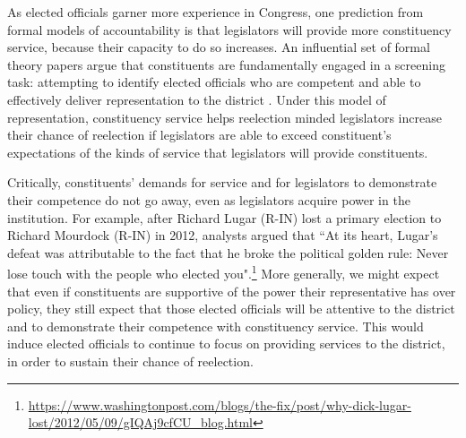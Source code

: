 \documentclass[12pt]{article}
\begin{document}
As elected officials garner more experience in Congress, one prediction from formal models of accountability is that legislators will provide more constituency service, because their capacity to do so increases.  An influential set of formal theory papers argue that constituents are fundamentally engaged in a screening task: attempting to identify elected officials who are competent and able to effectively deliver representation to the district \citep{AshworthBuenodeMesquita2006, gordon2009advantages}.  Under this model of representation, constituency service helps reelection minded legislators increase their chance of reelection if legislators are able to exceed constituent's expectations of the kinds of service that legislators will provide constituents.  

Critically, constituents' demands for service and for legislators to demonstrate their competence do not go away, even as legislators acquire power in the institution.  For example, after Richard Lugar (R-IN) lost a primary election to Richard Mourdock (R-IN) in 2012, analysts argued that ``At its heart, Lugar's defeat was attributable to the fact that he broke the political golden rule: Never lose touch with the people who elected you".\footnote{\url{https://www.washingtonpost.com/blogs/the-fix/post/why-dick-lugar-lost/2012/05/09/gIQAj9cfCU_blog.html}}  More generally, we might expect that even if constituents are supportive of the power their representative has over policy, they still expect that those elected officials will be attentive to the district and to demonstrate their competence with constituency service.  This would induce elected officials to continue to focus on providing services to the district, in order to sustain their chance of reelection.       %

\end{document}
